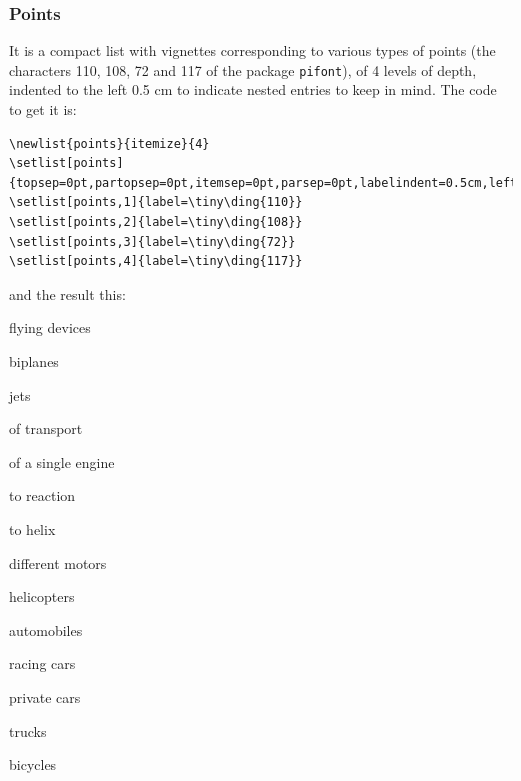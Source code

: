 \documentclass[a4paper,
                             twoside,
                             BCOR1.0cm,
                             DIV11,
                             parskip=full,
                             11pt]{scrbook}
\begin{document}
\subsubsection{Points}\label{ssbsec:points}
It is a compact list with vignettes corresponding to various types of points (the characters 110, 108, 72 and 117 of the package \verb+pifont+), of 4 levels of depth, indented to the left 0.5 cm to indicate nested entries to keep in mind. The code to get it is:

\begin{tiny}
\begin{verbatim}
\newlist{points}{itemize}{4}
\setlist[points]{topsep=0pt,partopsep=0pt,itemsep=0pt,parsep=0pt,labelindent=0.5cm,leftmargin=*}
\setlist[points,1]{label=\tiny\ding{110}}
\setlist[points,2]{label=\tiny\ding{108}}
\setlist[points,3]{label=\tiny\ding{72}}
\setlist[points,4]{label=\tiny\ding{117}}
\end{verbatim}
\end{tiny}
and the result this:
\begin{points}
\item flying devices
	\begin{points}
		\item biplanes
		\item jets
		\item of transport
			\begin{points}
				\item of a single engine
					\begin{points}
						\item to reaction
						\item to helix
					\end{points}
				\item different motors
			\end{points}
		\item helicopters
	\end{points}
\item automobiles
	\begin{points}
		\item racing cars
		\item private cars
		\item trucks
\end{points}
\item bicycles
\end{points}
\end{document}
